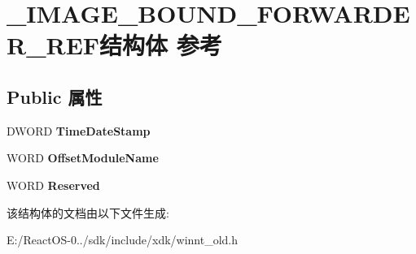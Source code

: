 \hypertarget{struct___i_m_a_g_e___b_o_u_n_d___f_o_r_w_a_r_d_e_r___r_e_f}{}\section{\+\_\+\+I\+M\+A\+G\+E\+\_\+\+B\+O\+U\+N\+D\+\_\+\+F\+O\+R\+W\+A\+R\+D\+E\+R\+\_\+\+R\+E\+F结构体 参考}
\label{struct___i_m_a_g_e___b_o_u_n_d___f_o_r_w_a_r_d_e_r___r_e_f}
\subsection*{Public 属性}
\begin{DoxyCompactItemize}
\item 
\mbox{\label{struct___i_m_a_g_e___b_o_u_n_d___f_o_r_w_a_r_d_e_r___r_e_f_a424dad0996a8f21c729ef4f02eb05471}} 
D\+W\+O\+RD {\bfseries Time\+Date\+Stamp}
\item 
\mbox{\label{struct___i_m_a_g_e___b_o_u_n_d___f_o_r_w_a_r_d_e_r___r_e_f_a747c92cf09e9734fa363771cbba966ba}} 
W\+O\+RD {\bfseries Offset\+Module\+Name}
\item 
\mbox{\label{struct___i_m_a_g_e___b_o_u_n_d___f_o_r_w_a_r_d_e_r___r_e_f_ad90d6547834705d062472e26db0ab279}} 
W\+O\+RD {\bfseries Reserved}
\end{DoxyCompactItemize}


该结构体的文档由以下文件生成\+:\begin{DoxyCompactItemize}
\item 
E\+:/\+React\+O\+S-\/0../sdk/include/xdk/winnt\+\_\+old.\+h\end{DoxyCompactItemize}
